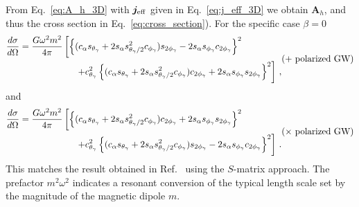 \documentclass[a4paper,11pt]{article}
\begin{document}
From Eq.~\eqref{eq:A_h_3D} with $\bm{j}_{\rm eff}$ given in Eq.~\eqref{eq:j_eff_3D} we obtain $ {\bm A}_{h} $, and thus the cross section in Eq.~\eqref{eq:cross_section}). For the specific case $ \beta = 0 $
%
\begin{equation}
    \begin{aligned}
    \frac{d\sigma}{d\Omega} 
    = \frac{G \omega^{2} m^{2}}{4 \pi} 
       & \left[ \left\{  (c_{\alpha} s_{\theta_{\gamma}} + 2 s_{\alpha} s_{ \theta_{\gamma}/2 }^{2} c_{\phi_{\gamma}} ) s_{2\phi_{\gamma}} - 2 s_{\alpha} s_{\phi_{\gamma}} c_{2\phi_{\gamma}} \right\}^{2}  \right. \\
        & \hspace{0.5cm} \left. + c_{\theta_{\gamma}}^{2} \left\{ (c_{\alpha} s_{\theta_{\gamma}} + 2 s_{\alpha} s_{ \theta_{\gamma}/2 }^{2} c_{\phi_{\gamma}} ) c_{2\phi_{\gamma}} + 2 s_{\alpha} s_{\phi_{\gamma}} s_{2\phi_{\gamma}} \right\}^{2} \right] \,,
\end{aligned}
 (\text{$+$ polarized GW})
\end{equation}
%
and
%
\begin{equation}
    \begin{aligned}
    \frac{d\sigma}{d\Omega} 
    = \frac{G \omega^{2} m^{2}}{4 \pi} 
       & \left[ \left\{  (c_{\alpha} s_{\theta_{\gamma}} + 2 s_{\alpha} s_{ \theta_{\gamma}/2 }^{2} c_{\phi_{\gamma}} ) c_{2\phi_{\gamma}} + 2 s_{\alpha} s_{\phi_{\gamma}} s_{2\phi_{\gamma}} \right\}^{2}  \right. \\
        & \hspace{0.5cm} \left. + c_{\theta_{\gamma}}^{2} \left\{ (c_{\alpha} s_{\theta_{\gamma}} + 2 s_{\alpha} s_{ \theta_{\gamma}/2 }^{2} c_{\phi_{\gamma}} ) s_{2\phi_{\gamma}} - 2 s_{\alpha} s_{\phi_{\gamma}} c_{2\phi_{\gamma}} \right\}^{2} \right] \,.
\end{aligned}
 (\text{$\times$ polarized GW})
\end{equation}
%
This matches the result obtained in Ref.~\cite{DeLogi:1977qe} using the $S$-matrix approach.
%
The prefactor $m^2 \omega^2$ indicates a resonant conversion of the typical length scale set by the magnitude of the magnetic dipole $m$.
%
\end{document}
